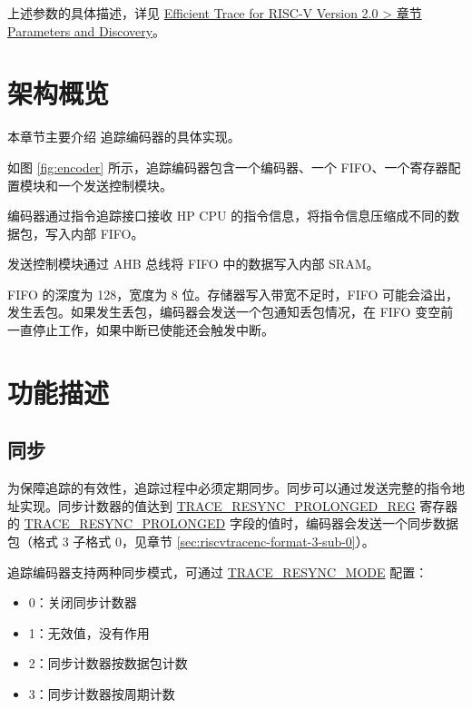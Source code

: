 \documentclass[main\_\_CN.tex]{subfiles}
\begin{document}
上述参数的具体描述，详见 \href{https://github.com/riscv-non-isa/riscv-trace-spec/releases}{Efficient Trace for RISC-V Version 2.0 > 章节 Parameters and Discovery}。


\section{架构概览}
\label{sec:riscvtracenc-arch-overview}


本章节主要介绍 \chipname{} 追踪编码器的具体实现。

如图 \ref{fig:encoder} 所示，追踪编码器包含一个编码器、一个 FIFO、一个寄存器配置模块和一个发送控制模块。

编码器通过指令追踪接口接收 HP CPU 的指令信息，将指令信息压缩成不同的数据包，写入内部 FIFO。

发送控制模块通过 AHB 总线将 FIFO 中的数据写入内部 SRAM。

FIFO 的深度为 128，宽度为 8 位。存储器写入带宽不足时，FIFO 可能会溢出，发生丢包。如果发生丢包，编码器会发送一个包通知丢包情况，在 FIFO 变空前一直停止工作，如果中断已使能还会触发中断。



\section{功能描述}
\label{sec:riscvtracenc-func-desc}

\subsection{同步}

为保障追踪的有效性，追踪过程中必须定期同步。同步可以通过发送完整的指令地址实现。同步计数器的值达到 \hyperref[regdesc:TRACERESYNCPROLONGEDREG]{TRACE\_RESYNC\_PROLONGED\_REG} 寄存器的 \hyperref[fielddesc:TRACERESYNCPROLONGED]{TRACE\_RESYNC\_PROLONGED} 字段的值时，编码器会发送一个同步数据包（格式 3 子格式 0，见章节 \ref{sec:riscvtracenc-format-3-sub-0}）。

追踪编码器支持两种同步模式，可通过 \hyperref[fielddesc:TRACERESYNCMODE]{TRACE\_RESYNC\_MODE} 配置：
\begin{itemize}
    \item 0：关闭同步计数器
    \item 1：无效值，没有作用
    \item 2：同步计数器按数据包计数
    \item 3：同步计数器按周期计数
\end{itemize}
\end{document}
